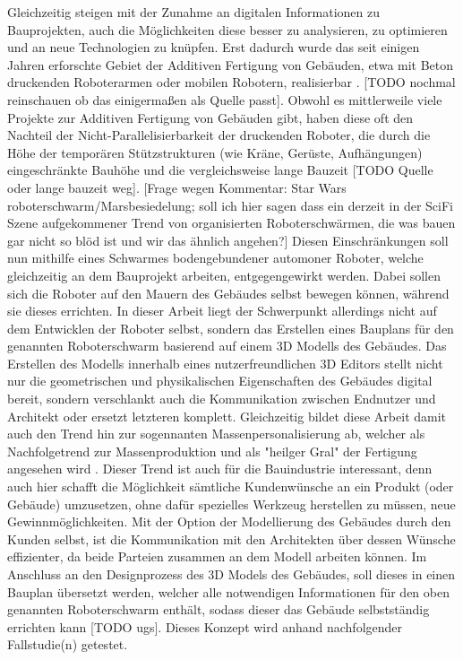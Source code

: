 Gleichzeitig steigen mit der Zunahme an digitalen Informationen zu Bauprojekten, auch die Möglichkeiten diese besser zu analysieren, zu optimieren und an neue Technologien zu knüpfen.
Erst dadurch wurde das seit einigen Jahren erforschte Gebiet der Additiven Fertigung von Gebäuden, etwa mit Beton druckenden Roboterarmen oder mobilen Robotern, realisierbar \cite{AdditiveManufacturingUsingMobileRobots}. [TODO nochmal reinschauen ob das einigermaßen als Quelle passt]. 
Obwohl es mittlerweile viele Projekte zur Additiven Fertigung von Gebäuden gibt, haben diese oft den Nachteil der Nicht-Parallelisierbarkeit der druckenden Roboter, die durch die Höhe der temporären Stützstrukturen (wie Kräne, Gerüste, Aufhängungen) eingeschränkte Bauhöhe und die vergleichsweise lange Bauzeit [TODO Quelle oder lange bauzeit weg].
[Frage wegen Kommentar: Star Wars roboterschwarm/Marsbesiedelung; soll ich hier sagen dass ein derzeit in der SciFi Szene aufgekommener Trend von organisierten Roboterschwärmen, die was bauen gar nicht so blöd ist und wir das ähnlich angehen?]
Diesen Einschränkungen soll nun mithilfe eines Schwarmes bodengebundener automoner Roboter, welche gleichzeitig an dem Bauprojekt arbeiten, entgegengewirkt werden.
Dabei sollen sich die Roboter auf den Mauern des Gebäudes selbst bewegen können, während sie dieses errichten.
In dieser Arbeit liegt der Schwerpunkt allerdings nicht auf dem Entwicklen der Roboter selbst, sondern das Erstellen eines Bauplans für den genannten Roboterschwarm basierend auf einem 3D Modells des Gebäudes.
Das Erstellen des Modells innerhalb eines nutzerfreundlichen 3D Editors stellt nicht nur die geometrischen und physikalischen Eigenschaften des Gebäudes digital bereit, sondern verschlankt auch die Kommunikation zwischen Endnutzer und Architekt oder ersetzt letzteren komplett.
Gleichzeitig bildet diese Arbeit damit  auch den Trend hin zur sogennanten Massenpersonalisierung ab, welcher als Nachfolgetrend zur Massenproduktion und als "heilger Gral" der Fertigung angesehen wird
.
Dieser Trend ist auch für die Bauindustrie interessant, denn auch hier schafft die Möglichkeit sämtliche 
Kundenwünsche an ein Produkt (oder Gebäude) umzusetzen, ohne dafür spezielles Werkzeug herstellen zu müssen, neue Gewinnmöglichkeiten.
Mit der Option der Modellierung des Gebäudes durch den Kunden selbst, ist die Kommunikation mit den Architekten über dessen Wünsche effizienter, da beide Parteien zusammen an dem Modell arbeiten können.
Im Anschluss an den Designprozess des 3D Models des Gebäudes, soll dieses in einen Bauplan übersetzt werden, welcher alle notwendigen Informationen für den oben genannten Roboterschwarm enthält, sodass dieser das Gebäude selbstständig errichten kann [TODO ugs].
Dieses Konzept wird anhand nachfolgender Fallstudie(n) getestet.



